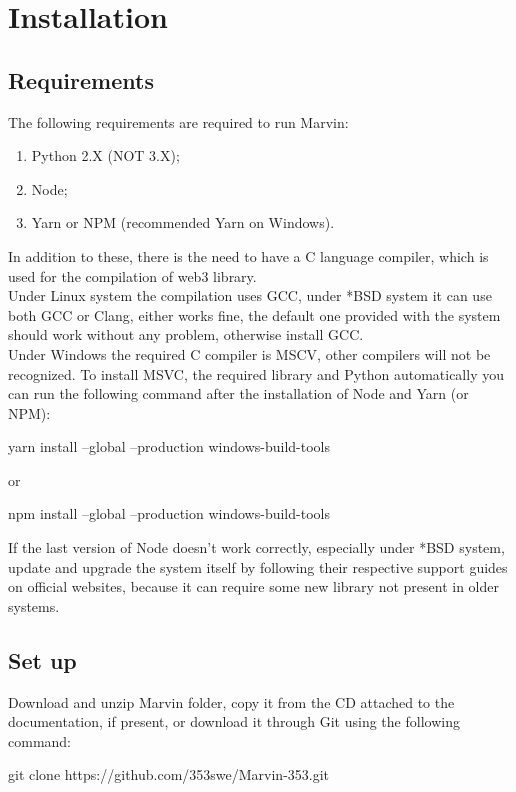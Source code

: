 \documentclass[ManualeSviluppatore]{subfiles}
\begin{document}
\chapter{Installation}
\section{Requirements}
The following requirements are required to run Marvin:
\begin{enumerate}
	\item Python 2.X (NOT 3.X);
	\item Node;
	\item Yarn or NPM (recommended Yarn on Windows).
\end{enumerate}
In addition to these, there is the need to have a C language compiler, which is used for the compilation of web3 library.\\

Under Linux system the compilation uses GCC, under *BSD system it can use both GCC or Clang, 	
either works fine, the default one provided with the system should work without any problem, otherwise install GCC. \\

Under Windows the required C compiler is MSCV, other compilers will not be recognized. To install MSVC, the required library and Python automatically you can run the following command after the installation of Node and Yarn (or NPM): \\
\begin{ttfamily}
yarn install --global --production windows-build-tools \\
\end{ttfamily}
or \\
\begin{ttfamily}
npm install --global --production windows-build-tools \\
\end{ttfamily}

If the last version of Node doesn't work correctly, especially under *BSD system, update and upgrade the system itself by following their respective support guides on official websites, because it can require some new library not present in older systems.

\section{Set up}
Download and unzip Marvin folder, copy it from the CD attached to the documentation, if present, or download it through Git using the following command: \\
\begin{ttfamily}
	git clone https://github.com/353swe/Marvin-353.git \\
\end{ttfamily}
\end{document}
